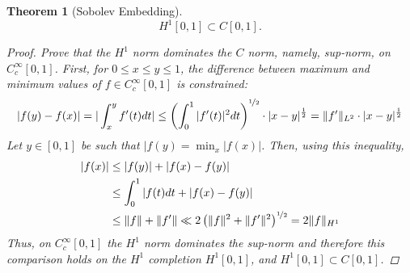 \documentclass[fontsize=14pt,a4paper,DIV=1]{scrartcl}
\newtheorem{theorem}{Theorem}[section]
\numberwithin{equation}{section}
\begin{document}
\begin{theorem}[Sobolev Embedding] %
	\[ H^{1}[0, 1] \subset C[0, 1]. \]
\begin{proof} %
Prove that the $H^{1}$ norm dominates the $C$ norm, namely, sup-norm, on $C_{c}^{\infty}[0, 1]$. First, for $0 \leq x \leq y \leq 1$, the difference between maximum and minimum values of $f \in C_{c}^{\infty}[0, 1]$ is constrained:
	\[ |f(y) - f(x)| = | \int_{x}^{y} f'(t) dt | \leq \left( \int_{0}^{1} |f'(t)|^{2} dt \right)^{\nicefrac{1}{2}} \cdot |x-y|^{\frac{1}{2}} = \|f'\|_{L^2} \cdot |x - y|^{\frac{1}{2}} \]
	Let $y \in [0, 1]$ be such that $|f(y) = \min_{x}|f(x)|$. Then, using this inequality,
	\begin{align*}
		|f(x)| & \leq |f(y)| + |f(x) - f(y)| \\
			   & \leq \int_{0}^{1} |f(t) dt + |f(x) - f(y)| \\
			   & \leq \| f \| + \| f' \| \ll 2 \left(  \| f \|^{2} + \| f' \|^{2} \right)^{\nicefrac{1}{2}} = 2 \|f\|_{H^{1}}
	\end{align*}
	Thus, on $C_{c}^{\infty}[0,1]$ the $H^{1}$ norm dominates the sup-norm and therefore this comparison holds on the $H^{1}$ completion $H^{1}[0,1]$, and $H^{1}[0,1] \subset C[0,1]$.
\end{proof}
\end{theorem}
\end{document}
